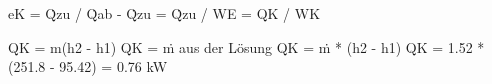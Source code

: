 eK = Q̇zu / Q̇ab - Q̇zu = Q̇zu / WE = QK / WK  

QK = m(h2 - h1)  
QK = ṁ aus der Lösung  
QK = ṁ * (h2 - h1)  
QK = 1.52 * (251.8 - 95.42) = 0.76 kW